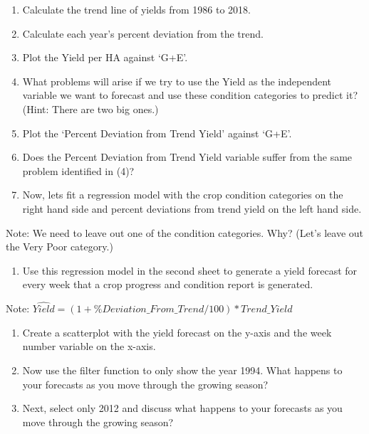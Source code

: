\documentclass[
  letterpaper,
  DIV=11,
  numbers=noendperiod]{scrreprt}
\providecommand{\tightlist}{%
  \setlength{\itemsep}{0pt}\setlength{\parskip}{0pt}}\usepackage{longtable,booktabs,array}
\begin{document}
\begin{enumerate}
\def\labelenumi{\arabic{enumi}.}
\tightlist
\item
  Calculate the trend line of yields from 1986 to 2018.
\item
  Calculate each year's percent deviation from the trend.
\item
  Plot the Yield per HA against `G+E'.
\item
  What problems will arise if we try to use the Yield as the independent
  variable we want to forecast and use these condition categories to
  predict it? (Hint: There are two big ones.)
\item
  Plot the `Percent Deviation from Trend Yield' against `G+E'.
\item
  Does the Percent Deviation from Trend Yield variable suffer from the
  same problem identified in (4)?
\item
  Now, lets fit a regression model with the crop condition categories on
  the right hand side and percent deviations from trend yield on the
  left hand side.
\end{enumerate}

Note: We need to leave out one of the condition categories. Why? (Let's
leave out the Very Poor category.)

\begin{enumerate}
\def\labelenumi{\arabic{enumi}.}
\setcounter{enumi}{7}
\tightlist
\item
  Use this regression model in the second sheet to generate a yield
  forecast for every week that a crop progress and condition report is
  generated.
\end{enumerate}

Note: \(\hat{Yield}=(1+\%Deviation\_From\_Trend/100)*Trend\_Yield\)

\begin{enumerate}
\def\labelenumi{\arabic{enumi}.}
\setcounter{enumi}{8}
\item
  Create a scatterplot with the yield forecast on the y-axis and the
  week number variable on the x-axis.
\item
  Now use the filter function to only show the year 1994. What happens
  to your forecasts as you move through the growing season?
\item
  Next, select only 2012 and discuss what happens to your forecasts as
  you move through the growing season?
\end{enumerate}

\end{document}
